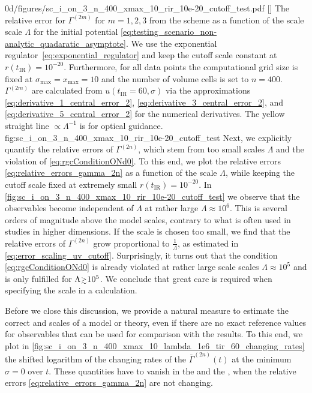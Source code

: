 \halfWidthFigure%
	{0d/figures/sc_i_on_3_n_400_xmax_10_rir_10e-20_cutoff_test.pdf}
	[]
	{%
		The relative error for $\Gamma^{(2m)}$ for $m = 1, 2, 3$ from the \kt{} scheme as a function of the \uv{} scale scale $\Lambda$ for the initial potential \eqref{eq:testing_scenario_non-analytic_quadaratic_asymptote}.
		We use the exponential regulator~\eqref{eq:exponential_regulator} and keep the \ir{} cutoff scale constant at $r ( t_\mathrm{IR} ) = 10^{-20}$.
		Furthermore, for all data points the computational grid size is fixed at $\sigma_\mathrm{max} = x_\mathrm{max} = 10$ and the number of volume cells is set to $n = 400$.
		$\Gamma^{(2m)}$ are calculated from $u ( t_\mathrm{IR} = 60, \sigma )$ via the approximations \eqref{eq:derivative_1_central_error_2}, \eqref{eq:derivative_3_central_error_2}, and \eqref{eq:derivative_5_central_error_2} for the numerical derivatives. The yellow straight line $\propto\Lambda^{-1}$ is for optical guidance.
	}%
	{fig:sc_i_on_3_n_400_xmax_10_rir_10e-20_cutoff_test}
Next, we explicitly quantify the relative errors of $\Gamma^{(2n)}$, which stem from too small \uv{} scales $\Lambda$ and the violation of \rgcy{} \eqref{eq:rgcConditionONd0}.
To this end, we plot the relative errors \eqref{eq:relative_errors_gamma_2n} as a function of the \uv{} scale $\Lambda$, while keeping the \ir{} cutoff scale fixed at extremely small $r ( t_\mathrm{IR}) = 10^{-20}$.
In \cref{fig:sc_i_on_3_n_400_xmax_10_rir_10e-20_cutoff_test} we observe that the \ir{} observables become independent of $\Lambda$ at rather large $\Lambda \approx 10^6$.
This is several orders of magnitude above the model scales, contrary to what is often used in \frg{} studies in higher dimensions.
If the \uv{} scale is chosen too small, we find that the relative errors of $\Gamma^{(2n)}$ grow proportional to $\frac{1}{\Lambda}$, as estimated in \cref{eq:error_scaling_uv_cutoff}.
Surprisingly, it turns out that the \rgcy{} condition \eqref{eq:rgcConditionONd0} is already violated at rather large \uv{} scale scales $\Lambda \approx 10^5$ and is only fulfilled for $\Lambda \smallergtrsim 10^5$. 
We conclude that great care is required when specifying the \uv{} scale in a \frg{} calculation.

Before we close this discussion, we provide a natural measure to estimate the correct \uv{} and \ir{} scales of a model or theory, even if there are no exact reference values for observables that can be used for comparison with the \frg{} results.
To this end, we plot in \cref{fig:sc_i_on_3_n_400_xmax_10_lambda_1e6_tir_60_changing_rates} the shifted logarithm of the changing rates of the $\bar{\Gamma}^{(2n)} ( t )$ at the \ir{} minimum $\sigma = 0$ over \rgtime{} $t$.
These quantities have to vanish in the \uv{} and the \ir{}, when the relative errors \eqref{eq:relative_errors_gamma_2n} are not changing.

